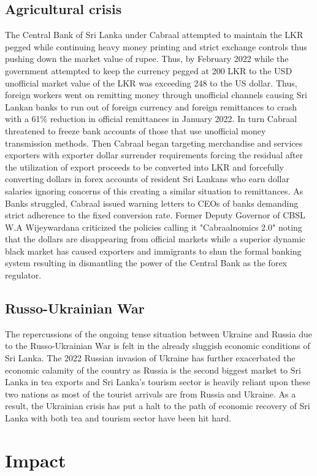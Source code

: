 \documentclass[a4paper,12pt]{article}
\begin{document}
\subsection{Agricultural crisis}
The Central Bank of Sri Lanka under Cabraal attempted to maintain the LKR pegged while continuing heavy money printing and strict exchange controls thus pushing down the market value of rupee. Thus, by February 2022 while the government attempted to keep the currency pegged at 200 LKR to the USD unofficial market value of the LKR was exceeding 248 to the US dollar. Thus, foreign workers went on remitting money through unofficial channels causing Sri Lankan banks to run out of foreign currency and foreign remittances to crash with a 61\% reduction in official remittances in January 2022. In turn Cabraal threatened to freeze bank accounts of those that use unofficial money transmission methods. Then Cabraal began targeting merchandise and services exporters with exporter dollar surrender requirements forcing the residual after the utilization of export proceeds to be converted into LKR and forcefully converting dollars in forex accounts of resident Sri Lankans who earn dollar salaries ignoring concerns of this creating a similar situation to remittances. As Banks struggled, Cabraal issued warning letters to CEOs of banks demanding strict adherence to the fixed conversion rate. Former Deputy Governor of CBSL W.A Wijeywardana criticized the policies calling it "Cabraalnomics 2.0" noting that the dollars are disappearing from official markets while a superior dynamic black market has caused exporters and immigrants to shun the formal banking system resulting in dismantling the power of the Central Bank as the forex regulator.
\subsection{Russo-Ukrainian War}
The repercussions of the ongoing tense situation between Ukraine and Russia due to the Russo-Ukrainian War is felt in the already sluggish economic conditions of Sri Lanka. The 2022 Russian invasion of Ukraine has further exacerbated the economic calamity of the country as Russia is the second biggest market to Sri Lanka in tea exports and Sri Lanka's tourism sector is heavily reliant upon these two nations as most of the tourist arrivals are from Russia and Ukraine. As a result, the Ukrainian crisis has put a halt to the path of economic recovery of Sri Lanka with both tea and tourism sector have been hit hard.
\section{Impact}
\end{document}
